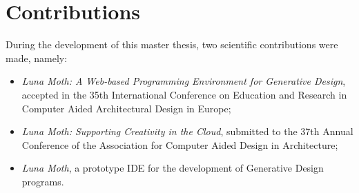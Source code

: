 

\chapter*{Contributions}

During the development of this master thesis, two scientific contributions were made, namely:
\begin{itemize}
\item \textit{Luna Moth: A Web-based Programming Environment for Generative Design}, accepted in the 35th International Conference on Education and Research in Computer Aided Architectural Design in Europe;
\item \textit{Luna Moth: Supporting Creativity in the Cloud}, submitted to the 37th Annual Conference of the Association for Computer Aided Design in Architecture;
\item \textit{Luna Moth}, a prototype IDE for the development of Generative Design programs.
\end{itemize}
